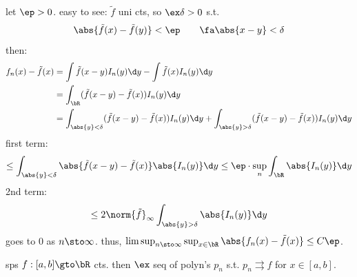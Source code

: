 \begin{pf}[source=Primary Source Material]
	let $\ep>0$. easy to see: $\tilde{f}$ uni cts, so $\ex\delta>0$ s.t.
	\begin{equation*}
		\abs{\tilde{f}(x)-\tilde{f}(y)}<\ep \qquad \fa\abs{x-y}<\delta
	\end{equation*}
	then:
	\begin{align*}
		f_{n}(x)-\tilde{f}(x)
		& = \int\tilde{f}(x-y)I_{n}(y)\d y - \int\tilde{f}(x)I_{n}(y)\d y \\
		& = \int_{\bR}(\tilde{f}(x-y)-\tilde{f}(x))I_{n}(y)\d y \\
		& = \int_{\abs{y}<\delta}(\tilde{f}(x-y)-\tilde{f}(x))I_{n}(y)\d y
		+ \int_{\abs{y}>\delta}(\tilde{f}(x-y)-\tilde{f}(x))I_{n}(y)\d y
	\end{align*}
	first term:
	\begin{equation*}
		\leq \int_{\abs{y}<\delta}\abs{\tilde{f}(x-y)-\tilde{f}(x)}\abs{I_{n}(y)}\d y
		\leq \ep\cdot\sup_{n}\int_{\bR}\abs{I_{n}(y)}\d y
	\end{equation*}
	2nd term:
	\begin{equation*}
		\leq 2\norm{\tilde{f}}_{\infty}\int_{\abs{y}>\delta}\abs{I_{n}(y)}\d y
	\end{equation*}
	goes to 0 as $n\sto\infty$.
	thus, $\limsup_{n\sto\infty}\sup_{x\in\bR}\abs{f_{n}(x)-\tilde{f}(x)}\leq C\ep$.
\end{pf}

\newpage
\begin{thm}[title=Weierstrass Approximation Theorem]
	sps $f:[a,b]\gto\bR$ cts.
	then $\ex$ seq of polyn's $p_{n}$ s.t. $p_{n}\rightrightarrows f$ for $x\in[a,b]$.
\end{thm} \

